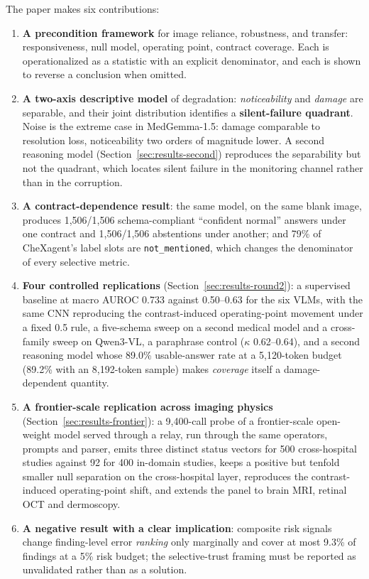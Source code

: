 The paper makes six contributions:
\begin{enumerate}[leftmargin=1.2em,itemsep=2pt,topsep=2pt]
\item \textbf{A precondition framework} for image reliance, robustness, and transfer: responsiveness, null model, operating point, contract coverage. Each is operationalized as a statistic with an explicit denominator, and each is shown to reverse a conclusion when omitted.
\item \textbf{A two-axis descriptive model} of degradation: \emph{noticeability} and \emph{damage} are separable, and their joint distribution identifies a \textbf{silent-failure quadrant}. Noise is the extreme case in MedGemma-1.5: damage comparable to resolution loss, noticeability two orders of magnitude lower. A second reasoning model (Section~\ref{sec:results-second}) reproduces the separability but not the quadrant, which locates silent failure in the monitoring channel rather than in the corruption.
\item \textbf{A contract-dependence result}: the same model, on the same blank image, produces 1,506/1,506 schema-compliant ``confident normal'' answers under one contract and 1,506/1,506 abstentions under another; and 79\% of CheXagent's label slots are \texttt{not\_mentioned}, which changes the denominator of every selective metric.
\item \textbf{Four controlled replications} (Section~\ref{sec:results-round2}): a supervised baseline at macro AUROC 0.733 against 0.50--0.63 for the six VLMs, with the same CNN reproducing the contrast-induced operating-point movement under a fixed 0.5 rule, a five-schema sweep on a second medical model and a cross-family sweep on Qwen3-VL, a paraphrase control ($\kappa$ 0.62--0.64), and a second reasoning model whose 89.0\% usable-answer rate at a 5,120-token budget (89.2\% with an 8,192-token sample) makes \emph{coverage} itself a damage-dependent quantity.
\item \textbf{A frontier-scale replication across imaging physics} (Section~\ref{sec:results-frontier}): a 9,400-call probe of a frontier-scale open-weight model served through a relay, run through the same operators, prompts and parser, emits three distinct status vectors for 500 cross-hospital studies against 92 for 400 in-domain studies, keeps a positive but tenfold smaller null separation on the cross-hospital layer, reproduces the contrast-induced operating-point shift, and extends the panel to brain MRI, retinal OCT and dermoscopy.
\item \textbf{A negative result with a clear implication}: composite risk signals change finding-level error \emph{ranking} only marginally and cover at most 9.3\% of findings at a 5\% risk budget; the selective-trust framing must be reported as unvalidated rather than as a solution.
\end{enumerate}

